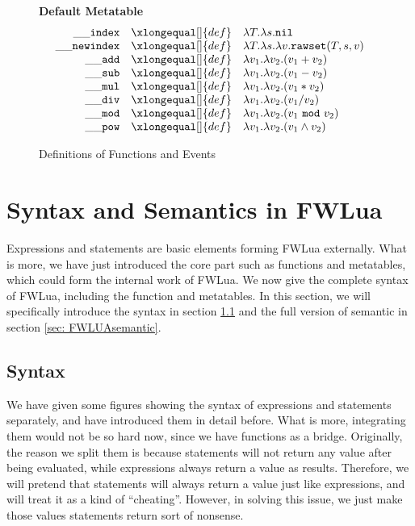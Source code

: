 
\begin{figure}[P]
\caption{Definitions of Functions and Events}
{\bf Default Metatable}
\label{fig:FW2.1metamethods}
\[
\begin{array}{rclcl}
  {\tt \_\_index}  & \xlongequal[]{def} & \aFunction{T}{\aFunction{s}{\tt nil}}\\
  
  {\tt \_\_newindex} & \xlongequal[]{def}  & \aFunction{T}{\aFunction{s}{\aFunction{v}{{\tt rawset}(T,s,v)}}}\\
 {\tt \_\_add}   & \xlongequal[]{def}  & \aFunction{v_1}{\aFunction{v_2}{(v_1+v_2)}} \\
 {\tt \_\_sub}   & \xlongequal[]{def}  & \aFunction{v_1}{\aFunction{v_2}{(v_1-v_2)}} \\
 {\tt \_\_mul}   & \xlongequal[]{def}  & \aFunction{v_1}{\aFunction{v_2}{(v_1*v_2)}} \\
 {\tt \_\_div}   & \xlongequal[]{def}  & \aFunction{v_1}{\aFunction{v_2}{(v_1/v_2)}} \\
 {\tt \_\_mod}   & \xlongequal[]{def}  & \aFunction{v_1}{\aFunction{v_2}{(v_1~{\tt mod}~v_2)}} \\
 {\tt \_\_pow}   & \xlongequal[]{def}  & \aFunction{v_1}{\aFunction{v_2}{(v_1 \wedge v_2)}} \\
         
\end{array}
\]
\end{figure}




\section{Syntax and Semantics in FWLua}\label{sec: syntax and semantic}
Expressions and statements are basic elements forming FWLua externally. What is more, we have just introduced the core part such as functions and metatables, which could form the internal work of FWLua. We now give the complete syntax of FWLua, including the function and metatables. In this section, we will specifically introduce the syntax in section \ref{sec: FWLUAsyntax} and the full version of semantic in section \ref{sec: FWLUAsemantic}.

\subsection{Syntax}\label{sec: FWLUAsyntax}
We have given some figures showing the syntax of expressions and statements separately, and have introduced them in detail before. What is more, integrating them would not be so hard now, since we have functions as a bridge. Originally, the reason we split them is because statements will not return any value after being evaluated, while expressions always return a value as results. Therefore, we will pretend that statements will always return a value just like expressions, and will treat it as a kind of ``cheating''. However, in solving this issue, we just make those values statements return sort of nonsense.

